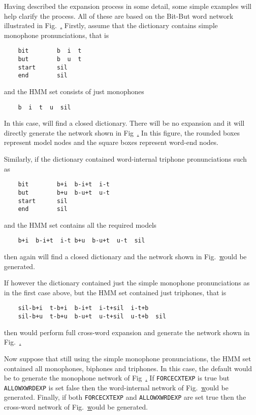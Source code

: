 
Having described the expansion process in some detail, some simple
examples will help clarify the process.  All of these are based
on the Bit-But word network illustrated in Fig.~\href{f:wdnet}.
Firstly, assume that the dictionary contains simple monophone
pronunciations, that is
\begin{verbatim}
    bit        b  i  t 
    but        b  u  t
    start      sil
    end        sil
\end{verbatim}
and the HMM set consists of just monophones
\begin{verbatim}
    b  i  t  u  sil
\end{verbatim}
In this case,  will find a closed dictionary.  There will
be no expansion and it will directly generate the network 
shown in Fig~\href{f:mononet}.  In this figure, the rounded boxes
represent model nodes and the square boxes represent word-end nodes.

Similarly, if the dictionary
contained word-internal triphone pronunciations such as
\begin{verbatim}
    bit        b+i  b-i+t  i-t 
    but        b+u  b-u+t  u-t
    start      sil
    end        sil
\end{verbatim}
and the HMM set contains all the required models
\begin{verbatim}
    b+i  b-i+t  i-t b+u  b-u+t  u-t  sil
\end{verbatim}
then again  will find a closed dictionary
and the network shown in Fig.~\href{f:wintnet} would be generated.


If however the dictionary contained just the simple monophone pronunciations
as in the first case above, but the HMM set contained just triphones,
that is
\begin{verbatim}
    sil-b+i  t-b+i  b-i+t  i-t+sil  i-t+b  
    sil-b+u  t-b+u  b-u+t  u-t+sil  u-t+b  sil
\end{verbatim}
then  would perform full cross-word expansion and
generate the network shown in Fig.~\href{f:xwrdnet}.


Now suppose that still using the simple monophone pronunciations,
the HMM set contained all monophones, biphones and triphones.  In this
case, the default would be to generate the monophone network of
Fig~\href{f:mononet}.  If \texttt{FORCECXTEXP} is true but 
\texttt{ALLOWXWRDEXP} is set false then the word-internal 
network
of Fig.~\href{f:wintnet} would be generated.  Finally, if both
\texttt{FORCECXTEXP}  and 
\texttt{ALLOWXWRDEXP} are set true then the cross-word network
of Fig.~\href{f:xwrdnet} would be generated. 

